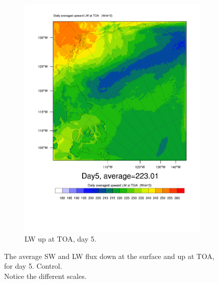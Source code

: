 \begin{figure}
\begin{subfigure}{0.48\textwidth}
		\includegraphics[width=\textwidth]{results/control/LWUPT_Day5.pdf}
		\caption{LW up at TOA, day 5.}
		\label{subfig:lwup_r1Day5}
	\end{subfigure}
	\caption{The average SW and LW flux down at the surface and up at TOA, for day 5. Control.\\Notice the different scales.}
	\label{fig:radiation_r1Day5}
\end{figure}


